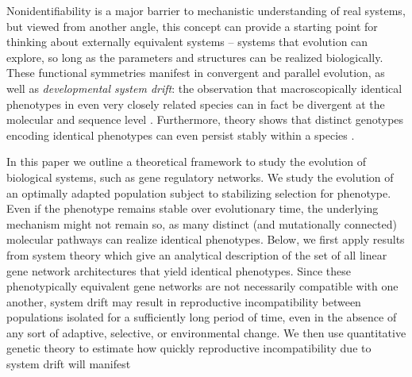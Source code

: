 \documentclass{article}
\newcommand{\1}{\mathbbm{1}}
\begin{document}
Nonidentifiability is a major barrier to mechanistic understanding of real systems, 
but viewed from another angle,
this concept can provide a starting point for thinking about externally equivalent systems
-- systems that evolution can explore, so long as the parameters and structures can be realized biologically.
These functional symmetries manifest in convergent and parallel evolution, 
as well as \emph{developmental system drift}: the observation that
macroscopically identical phenotypes in even very closely related species can in fact be divergent at the molecular and sequence level 
\citep{kimura1981possibility, true2001developmental, tanay2005conservation, tsong2006evolution, hare2008sepsid, lavoie2010evolutionary, vierstra2014mouse, matsui2015regulatory, dalal2016transcriptional, dalal2017transcription}.
Furthermore, theory shows that distinct genotypes encoding identical phenotypes can even persist stably within a species \citep{phillips1996maintenance}.

In this paper we outline a theoretical framework to study the evolution of biological systems, such as gene regulatory networks.
We study the evolution of an optimally adapted population subject to stabilizing selection for phenotype.
Even if the phenotype remains stable over evolutionary time, the underlying mechanism might not remain so,
as many distinct (and mutationally connected) molecular pathways can realize identical phenotypes.
Below, we first apply results from system theory which give
an analytical description of the set of 
all linear gene network architectures that yield identical phenotypes.
Since these phenotypically equivalent gene networks are not necessarily compatible with one another, 
system drift may result in reproductive incompatibility between populations 
isolated for a sufficiently long period of time, 
even in the absence of any sort of adaptive, selective, or environmental change. 
We then use quantitative genetic theory to estimate how quickly 
reproductive incompatibility due to system drift will manifest
\end{document}
